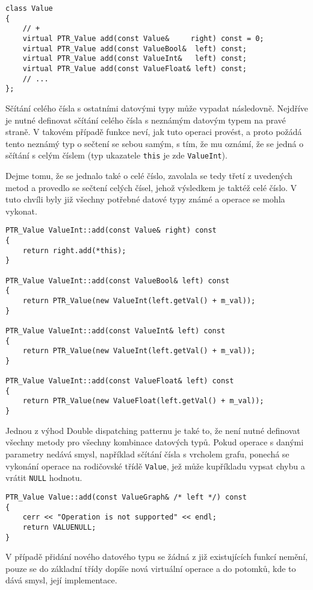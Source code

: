 \documentclass[11pt,twoside,a4paper]{book}
\begin{document}
\begin{verbatim}
class Value
{
    // +
    virtual PTR_Value add(const Value&     right) const = 0;
    virtual PTR_Value add(const ValueBool&  left) const;
    virtual PTR_Value add(const ValueInt&   left) const;
    virtual PTR_Value add(const ValueFloat& left) const;
    // ...
};
\end{verbatim}

Sčítání celého čísla s ostatními datovými typy může vypadat následovně. Nejdříve je nutné definovat sčítání celého čísla s neznámým datovým typem na pravé straně. V takovém případě funkce neví, jak tuto operaci provést, a proto požádá tento neznámý typ o sečtení se sebou samým, s tím, že mu oznámí, že se jedná o sčítání s celým číslem (typ ukazatele \texttt{this} je zde \texttt{ValueInt}).

Dejme tomu, že se jednalo také o celé číslo, zavolala se tedy třetí z uvedených metod a provedlo se sečtení celých čísel, jehož výsledkem je taktéž celé číslo. V tuto chvíli byly již všechny potřebné datové typy známé a operace se mohla vykonat.

\begin{verbatim}
PTR_Value ValueInt::add(const Value& right) const
{
    return right.add(*this);
}

PTR_Value ValueInt::add(const ValueBool& left) const
{
    return PTR_Value(new ValueInt(left.getVal() + m_val));
}

PTR_Value ValueInt::add(const ValueInt& left) const
{
    return PTR_Value(new ValueInt(left.getVal() + m_val));
}

PTR_Value ValueInt::add(const ValueFloat& left) const
{
    return PTR_Value(new ValueFloat(left.getVal() + m_val));
}
\end{verbatim}

Jednou z výhod Double dispatching patternu je také to, že není nutné definovat všechny metody pro všechny kombinace datových typů. Pokud operace s danými parametry nedává smysl, například sčítání čísla s vrcholem grafu, ponechá se vykonání operace na rodičovské třídě \texttt{Value}, jež může kupříkladu vypsat chybu a vrátit \texttt{NULL} hodnotu.

\begin{verbatim}
PTR_Value Value::add(const ValueGraph& /* left */) const
{
    cerr << "Operation is not supported" << endl;
    return VALUENULL;
}
\end{verbatim}

V případě přidání nového datového typu se žádná z již existujících funkcí nemění, pouze se do základní třídy dopíše nová virtuální operace a do potomků, kde to dává smysl, její implementace.
\end{document}
